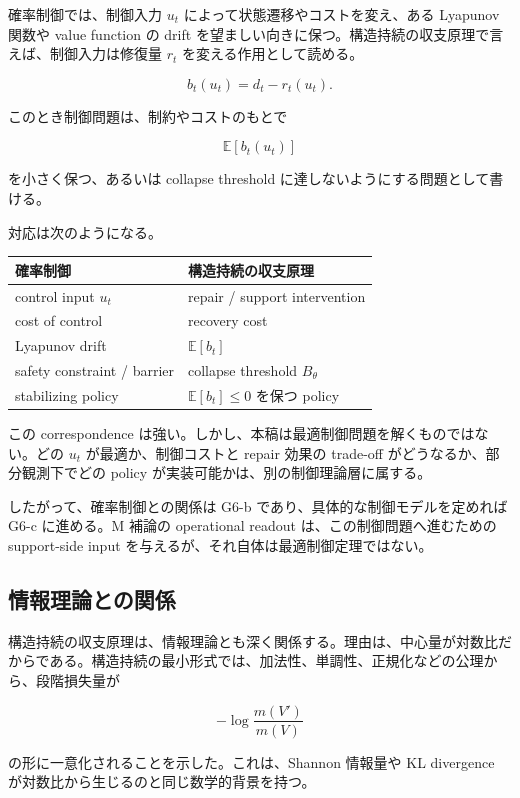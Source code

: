 \documentclass[12pt,a4paper]{article}
\begin{document}
確率制御では、制御入力 \(u_{t}\) によって状態遷移やコストを変え、ある Lyapunov 関数や value function の drift を望ましい向きに保つ。構造持続の収支原理で言えば、制御入力は修復量 \(r_{t}\) を変える作用として読める。

\[
b_{t}(u_{t})=d_{t}-r_{t}(u_{t}).
\]

このとき制御問題は、制約やコストのもとで

\[
\mathbb E[b_{t}(u_{t})]
\]

を小さく保つ、あるいは collapse threshold に達しないようにする問題として書ける。

対応は次のようになる。

{\def\LTcaptype{table} %
\begin{longtable}[]{@{}ll@{}}
\toprule\noalign{}
確率制御 & 構造持続の収支原理 \\
\midrule\noalign{}
\endhead
\bottomrule\noalign{}
\endlastfoot
control input \(u_t\) & repair / support intervention \\
cost of control & recovery cost \\
Lyapunov drift & \(\mathbb E[b_t]\) \\
safety constraint / barrier & collapse threshold \(B_\theta\) \\
stabilizing policy & \(\mathbb E[b_t]\le 0\) を保つ policy \\
\end{longtable}
}

この correspondence は強い。しかし、本稿は最適制御問題を解くものではない。どの \(u_{t}\) が最適か、制御コストと repair 効果の trade-off がどうなるか、部分観測下でどの policy が実装可能かは、別の制御理論層に属する。

したがって、確率制御との関係は G6-b であり、具体的な制御モデルを定めれば G6-c に進める。M 補論の operational readout は、この制御問題へ進むための support-side input を与えるが、それ自体は最適制御定理ではない。

\subsection{情報理論との関係}\label{ux60c5ux5831ux7406ux8ad6ux3068ux306eux95a2ux4fc2}

構造持続の収支原理は、情報理論とも深く関係する。理由は、中心量が対数比だからである。構造持続の最小形式では、加法性、単調性、正規化などの公理から、段階損失量が

\[
-\log \frac{m(V')}{m(V)}
\]

の形に一意化されることを示した。これは、Shannon 情報量や KL divergence が対数比から生じるのと同じ数学的背景を持つ。
\end{document}
